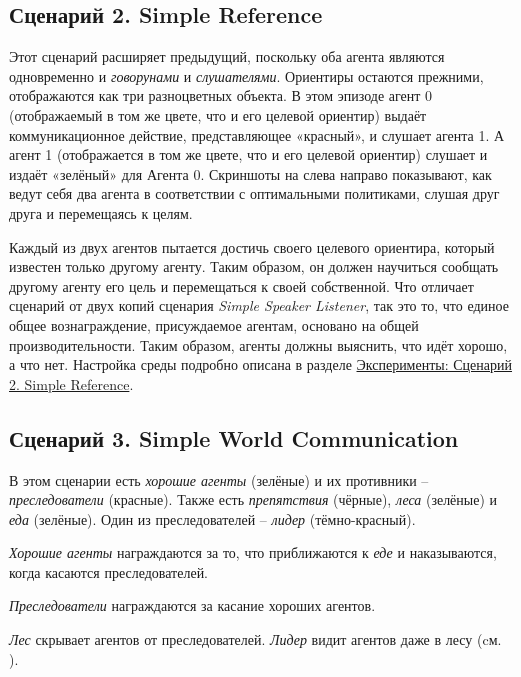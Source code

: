 \subsection{Сценарий 2. Simple Reference} \label{intro-sr}

Этот сценарий расширяет предыдущий, поскольку оба агента являются одновременно и \textit{говорунами} и \textit{слушателями}. Ориентиры остаются прежними, отображаются как три разноцветных объекта. В этом эпизоде агент 0 (отображаемый в том же цвете, что и его целевой ориентир) выдаёт коммуникационное действие, представляющее «красный», и слушает агента 1. А агент 1 (отображается в том же цвете, что и его целевой ориентир) слушает и издаёт «зелёный» для Агента 0. Скриншоты на  слева направо показывают, как ведут себя два агента в соответствии с оптимальными политиками, слушая друг друга и перемещаясь к целям.

Каждый из двух агентов пытается достичь своего целевого ориентира, который известен только другому агенту. Таким образом, он должен научиться сообщать другому агенту его цель и перемещаться к своей собственной. Что отличает сценарий от двух копий сценария \textit{Simple Speaker Listener}, так это то, что единое общее вознаграждение, присуждаемое агентам, основано на общей производительности. Таким образом, агенты должны выяснить, что идёт хорошо, а что нет. Настройка среды подробно описана в разделе \hyperref[exp-sr]{Эксперименты: Сценарий 2. Simple Reference}.

\subsection{Сценарий 3. Simple World Communication} \label{intro-swc}

В этом сценарии есть \textit{хорошие агенты} (зелёные) и их противники – \textit{преследователи} (красные). Также есть \textit{препятствия} (чёрные), \textit{леса} (зелёные) и \textit{еда} (зелёные). Один из преследователей – \textit{лидер} (тёмно-красный).

\textit{Хорошие агенты} награждаются за то, что приближаются к \textit{еде} и наказываются, когда касаются преследователей.

\textit{Преследователи} награждаются за касание хороших агентов.

\textit{Лес} скрывает агентов от преследователей. \textit{Лидер} видит агентов даже в лесу (cм. ).

